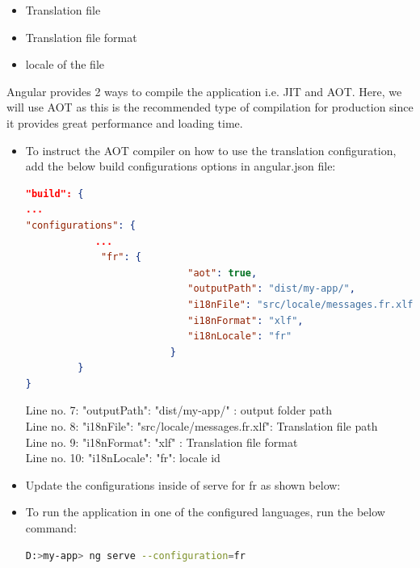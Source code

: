 \documentclass{report}
\begin{document}
\begin{enumerate}
\begin{itemize}
		\item{Translation file}
		\item{Translation file format}
		\item{locale of the file}
	\end{itemize}
	Angular provides 2 ways to compile the application i.e. JIT and AOT. Here, we will use AOT as this is the recommended type of compilation for production since it provides great performance and loading time.
	\begin{itemize}
		\item{ To instruct the AOT compiler on how to use the translation configuration, add the below build configurations options in angular.json file:}
			\begin{lstlisting}[language=json, caption=angular.json]
			"build": {
...
"configurations": {
			...
			 "fr": {
							"aot": true,
							"outputPath": "dist/my-app/",
							"i18nFile": "src/locale/messages.fr.xlf",
							"i18nFormat": "xlf",
							"i18nLocale": "fr"
						 }
		 }
}
		\end{lstlisting}
		Line no. 7: "outputPath": "dist/my-app/" : output folder path\\
		Line no. 8: "i18nFile": "src/locale/messages.fr.xlf": Translation file path\\
		Line no. 9:  "i18nFormat": "xlf" : Translation file format\\
		Line no. 10: "i18nLocale": "fr": locale id


	\item{Update the configurations inside of serve for fr as shown below:}
	\item{To run the application in one of the configured languages, run the below command:}
			\begin{lstlisting}[language=bash]
			D:>my-app> ng serve --configuration=fr
	\end{lstlisting}
\end{itemize}
\end{enumerate}
\end{document}
